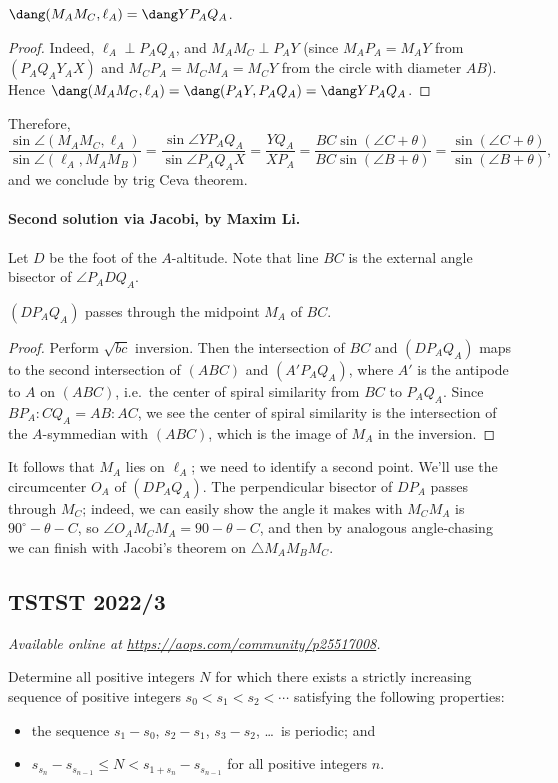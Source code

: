 \documentclass[11pt]{scrartcl}
\begin{document}
\begin{claim*}
  $\dang (M_AM_C, \ell_A) = \dang YP_AQ_A$.
\end{claim*}
\begin{proof}
  Indeed, $\ell_A \perp P_AQ_A$, and $M_AM_C \perp P_AY$
  (since $M_AP_A = M_AY$ from $(P_AQ_AY_AX)$
  and $M_CP_A = M_CM_A = M_CY$ from the circle with diameter $AB$).
  Hence $\dang (M_AM_C, \ell_A) = \dang (P_AY, P_AQ_A) = \dang YP_AQ_A$.
\end{proof}
Therefore,
\[
  \frac{\sin \angle (M_AM_C, \ell_A)}{\sin \angle (\ell_A, M_AM_B)}
  = \frac{\sin \angle YP_AQ_A}{\sin \angle P_AQ_AX}
  = \frac{YQ_A}{XP_A}
  = \frac{BC \sin (\angle C+ \theta) }{BC \sin (\angle B+ \theta)}
  = \frac{\sin (\angle C+ \theta)}{\sin (\angle B+ \theta)},
\]
and we conclude by trig Ceva theorem.

\paragraph{Second solution via Jacobi, by Maxim Li.}
Let $D$ be the foot of the $A$-altitude.
Note that line $BC$ is the external angle bisector of $\angle P_ADQ_A$.
\begin{claim*}
  $(DP_AQ_A)$ passes through the midpoint $M_A$ of $BC$.
\end{claim*}
\begin{proof}
  Perform $\sqrt{bc}$ inversion.
  Then the intersection of $BC$ and $(DP_AQ_A)$
  maps to the second intersection of $(ABC)$ and $(A'P_AQ_A)$,
  where $A'$ is the antipode to $A$ on $(ABC)$,
  i.e.\ the center of spiral similarity from $BC$ to $P_AQ_A$.
  Since $BP_A:CQ_A = AB:AC$, we see the center of spiral similarity
  is the intersection of the $A$-symmedian with $(ABC)$,
  which is the image of $M_A$ in the inversion.
\end{proof}

It follows that $M_A$ lies on $\ell_A$;
we need to identify a second point.
We'll use the circumcenter $O_A$ of $(DP_AQ_A)$.
The perpendicular bisector of $DP_A$ passes through $M_C$;
indeed, we can easily show the angle it makes with $M_CM_A$
is $90^\circ - \theta - C$, so $\angle O_AM_CM_A = 90 - \theta - C$,
and then by analogous angle-chasing
we can finish with Jacobi's theorem on $\triangle M_AM_BM_C$.
\pagebreak

\subsection{TSTST 2022/3}
\textsl{Available online at \url{https://aops.com/community/p25517008}.}
\begin{mdframed}[style=mdpurplebox,frametitle={Problem statement}]
Determine all positive integers $N$ for which there exists a strictly
increasing sequence of positive integers $s_0 < s_1 < s_2 < \dotsb$
satisfying the following properties:
\begin{itemize}
  \item the sequence $s_1-s_0$, $s_2-s_1$, $s_3-s_2$, \dots\ is periodic; and
  \item $s_{s_n} - s_{s_{n-1}} \le N < s_{1+s_n} - s_{s_{n-1}}$ for all
    positive integers $n$.
\end{itemize}
\end{mdframed}
\end{document}
